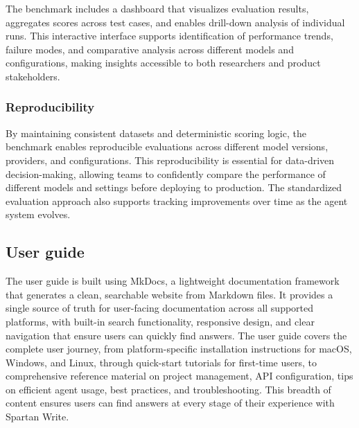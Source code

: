 The benchmark includes a dashboard that visualizes evaluation results, aggregates scores across test cases, and enables drill-down analysis of individual runs.
This interactive interface supports identification of performance trends, failure modes, and comparative analysis across different models and configurations, making insights accessible to both researchers and product stakeholders.

\subsubsection{Reproducibility}

By maintaining consistent datasets and deterministic scoring logic, the benchmark enables reproducible evaluations across different model versions, providers, and configurations.
This reproducibility is essential for data-driven decision-making, allowing teams to confidently compare the performance of different models and settings before deploying to production.
The standardized evaluation approach also supports tracking improvements over time as the agent system evolves.

\subsection{User guide}


The user guide is built using MkDocs, a lightweight documentation framework that generates a clean, searchable website from Markdown files.
It provides a single source of truth for user-facing documentation across all supported platforms, with built-in search functionality, responsive design, and clear navigation that ensure users can quickly find answers.
The user guide covers the complete user journey, from platform-specific installation instructions for macOS, Windows, and Linux, through quick-start tutorials for first-time users, to comprehensive reference material on project management, API configuration, tips on efficient agent usage, best practices, and troubleshooting.
This breadth of content ensures users can find answers at every stage of their experience with Spartan Write.

